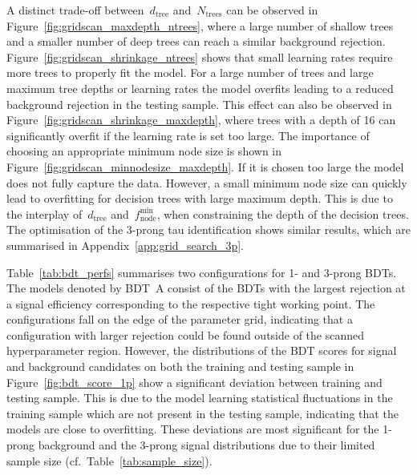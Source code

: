A distinct trade-off between~$d_\text{tree}$ and~$N_\text{trees}$ can be
observed in Figure~\ref{fig:gridscan_maxdepth_ntrees}, where a large number of
shallow trees and a smaller number of deep trees can reach a similar background
rejection. Figure~\ref{fig:gridscan_shrinkage_ntrees} shows that small learning
rates require more trees to properly fit the model. For a large number of trees
and large maximum tree depths or learning rates the model overfits leading to a
reduced background rejection in the testing sample. This effect can also be
observed in Figure~\ref{fig:gridscan_shrinkage_maxdepth}, where trees with a
depth of 16 can significantly overfit if the learning rate is set too large. The
importance of choosing an appropriate minimum node size is shown in
Figure~\ref{fig:gridscan_minnodesize_maxdepth}. If it is chosen too large the
model does not fully capture the data. However, a small minimum node size can
quickly lead to overfitting for decision trees with large maximum depth. This is
due to the interplay of~$d_\text{tree}$ and~$f_\text{node}^\text{min}$, when
constraining the depth of the decision trees. The optimisation of the 3-prong
tau identification shows similar results, which are summarised in
Appendix~\ref{app:grid_search_3p}.

Table~\ref{tab:bdt_perfs} summarises two configurations for 1- and 3-prong BDTs.
The models denoted by \mbox{BDT A} consist of the BDTs with the largest
rejection at a signal efficiency corresponding to the respective tight working
point. The configurations fall on the edge of the parameter grid, indicating
that a configuration with larger rejection could be found outside of the scanned
hyperparameter region. However, the distributions of the BDT scores for signal
and background \tauhadvis candidates on both the training and testing sample in
Figure~\ref{fig:bdt_score_1p} show a significant deviation between training and
testing sample. This is due to the model learning statistical fluctuations in
the training sample which are not present in the testing sample, indicating that
the models are close to overfitting. These deviations are most significant for
the 1-prong background and the 3-prong signal distributions due to their limited
sample size (cf.\ Table~\ref{tab:sample_size}).



